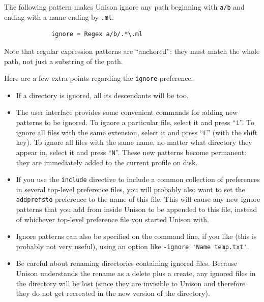 \documentclass{article}
\begin{document}
The following pattern makes Unison ignore any path beginning with \verb|a/b|
and ending with a name ending by \verb|.ml|.
\begin{verbatim}
             ignore = Regex a/b/.*\.ml
\end{verbatim}
Note that regular expression patterns are ``anchored'': they must
match the whole path, not just a substring of the path.

Here are a few extra points regarding the \texttt{ignore} preference.
\begin{itemize}
\item If a directory is ignored, all its descendants will be too.

\item The user interface provides some convenient commands for adding
  new patterns to be ignored.  To ignore a particular file, select it
  and press ``{\tt i}''.  To ignore all files with the same extension,
  select it and press ``{\tt E}'' (with the shift key).  To ignore all
  files with the same name, no matter what directory they appear in,
  select it and press ``{\tt N}''.
%
These new patterns become permanent: they
are immediately added to the current profile on disk.

\item If you use the \verb|include| directive to include a common
collection of preferences in several top-level preference files, you will
probably also want to set the \verb|addprefsto| preference to the name of
this file.  This will cause any new ignore patterns that you add from
inside Unison to be appended to this file, instead of whichever top-level
preference file you started Unison with.

\item Ignore patterns can also be specified on the command line, if
you like (this is probably not very useful), using an option like
\verb|-ignore 'Name temp.txt'|.

\item Be careful about renaming directories containing ignored files.
Because Unison understands the rename as a delete plus a create, any ignored
files in the directory will be lost (since they are invisible to Unison and
therefore they do not get recreated in the new version of the directory).


\end{itemize}
\end{document}
